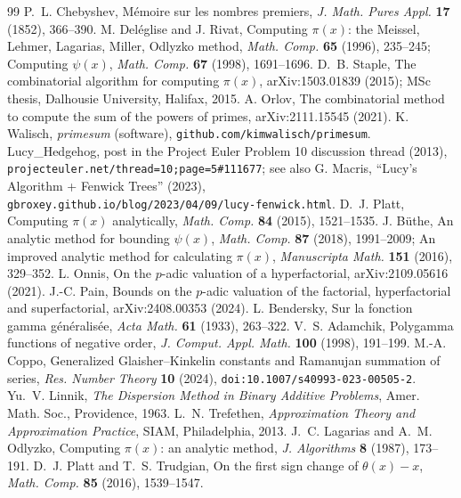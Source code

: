 \documentclass[11pt]{article}
\theoremstyle{remark}
\begin{document}
\begin{thebibliography}{99}
 P.~L. Chebyshev, M\'emoire sur les nombres premiers, \emph{J. Math. Pures Appl.}
\textbf{17} (1852), 366--390.
 M. Del\'eglise and J. Rivat, Computing $\pi(x)$: the Meissel, Lehmer, Lagarias, Miller,
Odlyzko method, \emph{Math. Comp.} \textbf{65} (1996), 235--245; Computing $\psi(x)$,
\emph{Math. Comp.} \textbf{67} (1998), 1691--1696.
 D.~B. Staple, The combinatorial algorithm for computing $\pi(x)$, arXiv:1503.01839
(2015); MSc thesis, Dalhousie University, Halifax, 2015.
 A. Orlov, The combinatorial method to compute the sum of the powers of primes,
arXiv:2111.15545 (2021).
 K. Walisch, \emph{primesum} (software), \texttt{github.com/kimwalisch/primesum}.
 Lucy\_Hedgehog, post in the Project Euler Problem 10 discussion thread (2013),
\texttt{projecteuler.net/thread=10;page=5\#111677}; see also
G. Macris, ``Lucy's Algorithm + Fenwick Trees'' (2023),
\texttt{gbroxey.github.io/blog/2023/04/09/lucy-fenwick.html}.
 D.~J. Platt, Computing $\pi(x)$ analytically, \emph{Math. Comp.} \textbf{84} (2015),
1521--1535.
 J. B\"uthe, An analytic method for bounding $\psi(x)$, \emph{Math. Comp.} \textbf{87}
(2018), 1991--2009; An improved analytic method for calculating $\pi(x)$, \emph{Manuscripta Math.}
\textbf{151} (2016), 329--352.
 L. Onnis, On the $p$-adic valuation of a hyperfactorial, arXiv:2109.05616 (2021).
 J.-C. Pain, Bounds on the $p$-adic valuation of the factorial, hyperfactorial and
superfactorial, arXiv:2408.00353 (2024).
 L. Bendersky, Sur la fonction gamma g\'en\'eralis\'ee, \emph{Acta Math.} \textbf{61}
(1933), 263--322.
 V.~S. Adamchik, Polygamma functions of negative order, \emph{J. Comput. Appl. Math.}
\textbf{100} (1998), 191--199.
 M.-A. Coppo, Generalized Glaisher--Kinkelin constants and Ramanujan summation of
series, \emph{Res. Number Theory} \textbf{10} (2024), \texttt{doi:10.1007/s40993-023-00505-2}.
 Yu.~V. Linnik, \emph{The Dispersion Method in Binary Additive Problems}, Amer. Math.
Soc., Providence, 1963.
 L.~N. Trefethen, \emph{Approximation Theory and Approximation Practice}, SIAM,
Philadelphia, 2013.
 J.~C. Lagarias and A.~M. Odlyzko, Computing $\pi(x)$: an analytic method,
\emph{J. Algorithms} \textbf{8} (1987), 173--191.
 D.~J. Platt and T.~S. Trudgian, On the first sign change of $\theta(x) - x$,
\emph{Math. Comp.} \textbf{85} (2016), 1539--1547.

\end{thebibliography}
\end{document}
